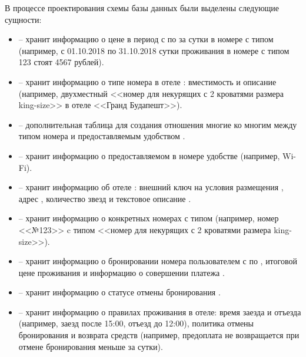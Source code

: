 В процессе проектирования схемы базы данных были выделены следующие сущности:
\begin{itemize}
	\item {} -- хранит информацию о цене  в период с  по  за сутки в номере с типом  (например, с 01.10.2018 по 31.10.2018 сутки проживания в номере с типом 123 стоят 4567 рублей).
	
	\item {} -- хранит информацию о типе номера  в отеле : вместимость  и описание  (например, двухместный <<номер для некурящих с 2 кроватями размера king-size>> в отеле <<Гранд Будапешт>>).
	
	\item {} -- дополнительная таблица для создания отношения многие ко многим между типом номера  и предоставляемым удобством .
	
	\item {} -- хранит информацию о предоставляемом в номере удобстве  (например, Wi-Fi).
	
	\item {} -- хранит информацию об отеле : внешний ключ на условия размещения , адрес , количество звезд  и текстовое описание .
	
	\item {} -- хранит информацию о конкретных номерах с типом  (например, номер <<№123>> c типом <<номер для некурящих с 2 кроватями размера king-size>>).
	
	\item {} -- хранит информацию о бронировании номера  пользователем  с  по , итоговой цене проживания  и информацию о совершении платежа .
	
	\item {} -- хранит информацию о статусе  отмены бронирования .
	
	\item {} -- хранит информацию о правилах проживания в отеле: время заезда  и отъезда  (например, заезд после 15:00, отъезд до 12:00), политика отмены бронирования и возврата средств  (например, предоплата не возвращается при отмене бронирования меньше за сутки).
	

\end{itemize}
